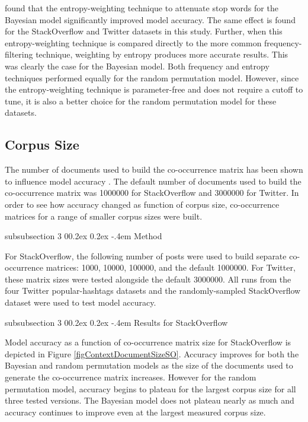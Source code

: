 \documentclass[man,floatsintext,donotrepeattitle]{apa6}
\makeatletter
\renewcommand{\subsubsection}{%
  \@startsection
  {subsubsection}%
  {3}%
  {\parindent}%
  {0\baselineskip \@plus 0.2ex \@minus 0.2ex}%
  {-.4em}%
  {\normalfont\normalsize\bfseries\addperi}}
\makeatother
\begin{document}
\textcite{Stanley2013} found that the entropy-weighting technique to attenuate stop words for the Bayesian model significantly improved model accuracy.
The same effect is found for the StackOverflow and Twitter datasets in this study.
Further, when this entropy-weighting technique is compared directly to the more common frequency-filtering technique, weighting by entropy produces more accurate results.
This was clearly the case for the Bayesian model.
Both frequency and entropy techniques performed equally for the random permutation model.
However, since the entropy-weighting technique is parameter-free and does not require a cutoff to tune, it is also a better choice for the random permutation model for these datasets.

\subsection{Corpus Size}

The number of documents used to build the co-occurrence matrix has been shown to influence model accuracy \parencite{Sahlgren2008}.
The default number of documents used to build the co-occurrence matrix was \num{1000000} for StackOverflow and \num{3000000} for Twitter.
In order to see how accuracy changed as function of corpus size, 
co-occurrence matrices for a range of smaller corpus sizes were built.

\subsubsection{Method}

For StackOverflow, the following number of posts were used to build separate co-occurrence matrices: \num{1000}, \num{10000}, \num{100000}, and the default \num{1000000}.
For Twitter, these matrix sizes were tested alongside the default \num{3000000}.
All runs from the four Twitter popular-hashtags datasets and the randomly-sampled StackOverflow dataset were used to test model accuracy.

\subsubsection{Results for StackOverflow}

Model accuracy as a function of co-occurrence matrix size for StackOverflow is depicted in Figure \ref{figContextDocumentSizeSO}.
Accuracy improves for both the Bayesian and random permutation models as the size of the documents used to generate the co-occurrence matrix increases.
However for the random permutation model, accuracy begins to plateau for the largest corpus size for all three tested versions. 
The Bayesian model does not plateau nearly as much and accuracy continues to improve even at the largest measured corpus size. 
\end{document}
